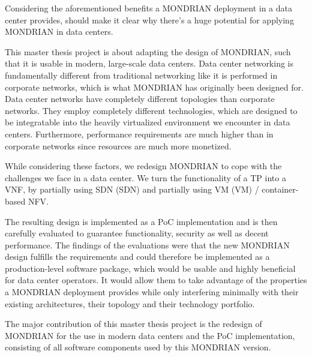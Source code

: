 Considering the aforementioned benefits a MONDRIAN deployment in a data center provides, should make it clear why there's a huge potential for applying MONDRIAN in data centers.


This master thesis project is about adapting the design of MONDRIAN, such that it is usable in modern, large-scale data centers. Data center networking is fundamentally different from traditional networking like it is performed in corporate networks, which is what MONDRIAN has originally been designed for. Data center networks have completely different topologies than corporate networks. They employ completely different technologies, which are designed to be integratable into the heavily virtualized environment we encounter in data centers. Furthermore, performance requirements are much higher than in corporate networks since resources are much more monetized. 

While considering these factors, we redesign MONDRIAN to cope with the challenges we face in a data center. We turn the functionality of a \acl{TP} into a \acl{VNF}, by partially using \acs{SDN} (\acl{SDN}) and partially using \acs{VM} (\acl{VM}) / container-based \acl{NFV}.

The resulting design is implemented as a \acl{PoC} implementation and is then carefully evaluated to guarantee functionality, security as well as decent performance. The findings of the evaluations were that the new MONDRIAN design fulfills the requirements and could therefore be implemented as a production-level software package, which would be usable and highly beneficial for data center operators. It would allow them to take advantage of the properties a MONDRIAN deployment provides while only interfering minimally with their existing architectures, their topology and their technology portfolio. 

The major contribution of this master thesis project is the redesign of MONDRIAN for the use in modern data centers and the \acl{PoC} implementation, consisting of all software components used by this MONDRIAN version.
